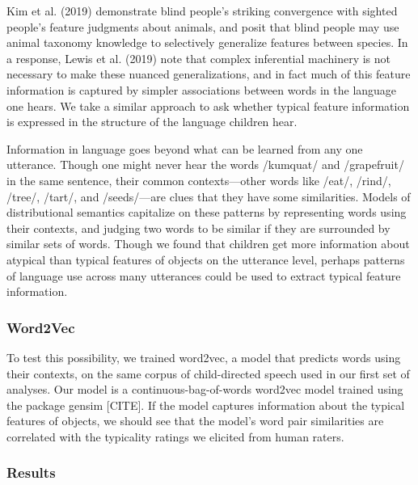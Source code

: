 \documentclass[10pt, letterpaper]{article}
\begin{document}
Kim et al. (2019) demonstrate blind people's striking convergence with
sighted people's feature judgments about animals, and posit that blind
people may use animal taxonomy knowledge to selectively generalize
features between species. In a response, Lewis et al. (2019) note that
complex inferential machinery is not necessary to make these nuanced
generalizations, and in fact much of this feature information is
captured by simpler associations between words in the language one
hears. We take a similar approach to ask whether typical feature
information is expressed in the structure of the language children hear.

Information in language goes beyond what can be learned from any one
utterance. Though one might never hear the words /kumquat/ and
/grapefruit/ in the same sentence, their common contexts---other words
like /eat/, /rind/, /tree/, /tart/, and /seeds/---are clues that they
have some similarities. Models of distributional semantics capitalize on
these patterns by representing words using their contexts, and judging
two words to be similar if they are surrounded by similar sets of words.
Though we found that children get more information about atypical than
typical features of objects on the utterance level, perhaps patterns of
language use across many utterances could be used to extract typical
feature information.

\hypertarget{word2vec}{%
\subsubsection{Word2Vec}\label{word2vec}}

To test this possibility, we trained word2vec, a model that predicts
words using their contexts, on the same corpus of child-directed speech
used in our first set of analyses. Our model is a
continuous-bag-of-words word2vec model trained using the package gensim
{[}CITE{]}. If the model captures information about the typical features
of objects, we should see that the model's word pair similarities are
correlated with the typicality ratings we elicited from human raters.

\hypertarget{results-1}{%
\subsubsection{Results}\label{results-1}}
\end{document}
